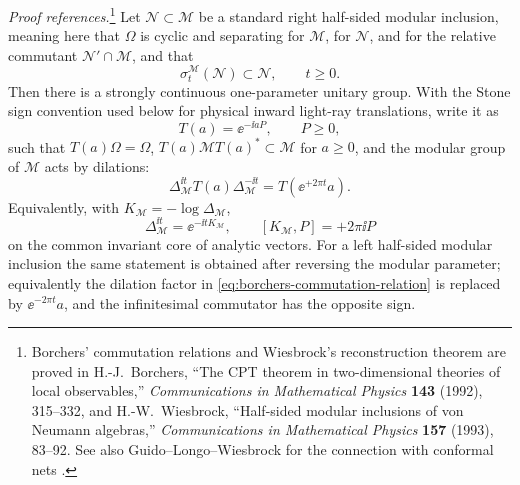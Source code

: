 \begin{quotedtheorem}
\label{thm:borchers-wiesbrock-half-sided-inclusion}
\emph{Proof references.}\footnote{Borchers' commutation relations and
Wiesbrock's reconstruction theorem are proved in H.-J.~Borchers,
``The CPT theorem in two-dimensional theories of local observables,''
\emph{Communications in Mathematical Physics} \textbf{143} (1992),
315--332, and H.-W.~Wiesbrock, ``Half-sided modular inclusions of von
Neumann algebras,'' \emph{Communications in Mathematical Physics}
\textbf{157} (1993), 83--92.  See also Guido--Longo--Wiesbrock for the
connection with conformal nets \cite{Borchers1992,Wiesbrock1993,Borchers2000}.}
Let \(\mathcal N\subset\mathcal M\) be a standard right half-sided modular
inclusion, meaning here that \(\Omega\) is cyclic and separating for
\(\mathcal M\), for \(\mathcal N\), and for the relative commutant
\(\mathcal N'\cap\mathcal M\), and that
\[
  \sigma_t^{\mathcal M}(\mathcal N)\subset\mathcal N,
  \qquad t\ge0 .
\]
Then there is a strongly continuous one-parameter unitary group.  With the
Stone sign convention used below for physical inward light-ray translations,
write it as
\[
  T(a)=\ee^{-\ii aP},\qquad P\ge0,
\]
such that \(T(a)\Omega=\Omega\), \(T(a)\mathcal M T(a)^*\subset\mathcal M\)
for \(a\ge0\), and the modular group of \(\mathcal M\) acts by dilations:
\begin{equation}
  \Delta_{\mathcal M}^{\ii t}T(a)\Delta_{\mathcal M}^{-\ii t}
  =
  T(\ee^{+2\pi t}a).
  \label{eq:borchers-commutation-relation}
\end{equation}
Equivalently, with \(K_{\mathcal M}=-\log\Delta_{\mathcal M}\),
\[
  \Delta_{\mathcal M}^{\ii t}=\ee^{-\ii tK_{\mathcal M}},
  \qquad
  [K_{\mathcal M},P]=+2\pi\ii P
\]
on the common invariant core of analytic vectors.
For a left half-sided modular inclusion the same statement is obtained after
reversing the modular parameter; equivalently the dilation factor in
\eqref{eq:borchers-commutation-relation} is replaced by
\(\ee^{-2\pi t}a\), and the infinitesimal commutator has the opposite sign.
\end{quotedtheorem}

